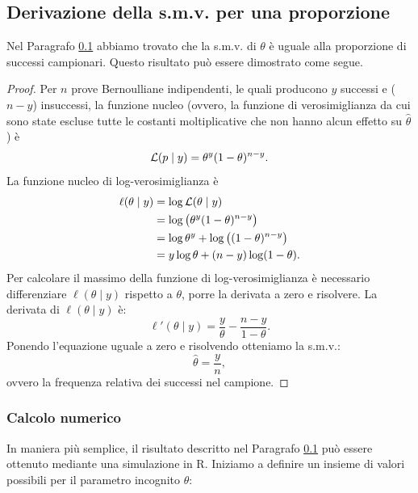 \documentclass[
]{memoir}
\newcommand{\R}{\textsf{R}} %
\theoremstyle{definition}
\theoremstyle{definition}
\theoremstyle{definition}
\theoremstyle{definition}
\theoremstyle{remark}
\begin{document}
\hypertarget{derivation-smv-prop}{%
\subsection{Derivazione della s.m.v. per una proporzione}\label{derivation-smv-prop}}

Nel Paragrafo \ref{derivation-smv-prop} abbiamo trovato che la s.m.v. di \(\theta\) è uguale alla proporzione di successi campionari. Questo risultato può essere dimostrato come segue.

\begin{proof}
Per \(n\) prove Bernoulliane indipendenti, le quali producono \(y\) successi e (\(n-y\)) insuccessi, la funzione nucleo (ovvero, la funzione di verosimiglianza da cui sono state escluse tutte le costanti moltiplicative che non hanno alcun effetto su \(\hat{\theta}\)) è
\[
\mathcal{L}(p \mid y) = \theta^y (1-\theta)^{n - y}.\notag
\]
La funzione nucleo di log-verosimiglianza è
\[
\begin{aligned}
\ell(\theta \mid y) &= \log \mathcal{L}(\theta \mid y) \notag\\
          &= \log \left(\theta^y (1-\theta)^{n - y} \right) \notag\\
          &= \log \theta^y + \log \left( (1-\theta)^{n - y} \right) \notag\\
          &= y \log \theta + (n - y) \log (1-\theta).\notag
\end{aligned}
\]
Per calcolare il massimo della funzione di log-verosimiglianza è necessario differenziare \(\ell(\theta \mid y)\) rispetto a \(\theta\), porre la derivata a zero e risolvere. La derivata di \(\ell(\theta \mid y)\) è:
\[
\ell'(\theta \mid y) = \frac{y}{\theta} -\frac{n-y}{1-\theta}.
\]
Ponendo l'equazione uguale a zero e risolvendo otteniamo la s.m.v.:
\begin{equation}
  \hat{\theta} = \frac{y}{n},
  \label{eq:mlprop}
\end{equation}
ovvero la frequenza relativa dei successi nel campione.
\end{proof}

\hypertarget{calcolo-numerico}{%
\subsubsection{Calcolo numerico}\label{calcolo-numerico}}

In maniera più semplice, il risultato descritto nel Paragrafo \ref{derivation-smv-prop} può essere ottenuto mediante una simulazione in \R. Iniziamo a definire un insieme di valori possibili per il parametro incognito \(\theta\):
\end{document}
